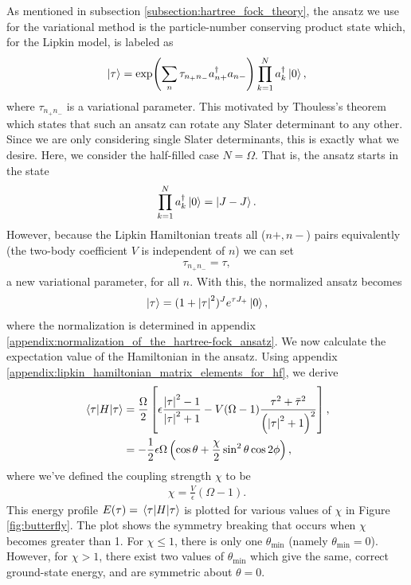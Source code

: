 \documentclass[10pt]{article}
\begin{document}
As mentioned in subsection \ref{subsection:hartree_fock_theory}, the ansatz we use for the variational method is the particle-number conserving product state which, for the Lipkin model, is labeled as
\begin{align}
\ket{\tau}=\exp(\sum_{n}\tau_{n_+n_-}a^\dagger_{n+}a_{n-})\prod_{k=1}^Na^\dagger_k\ket{0},
\end{align}
where $\tau_{n_+n_-}$ is a variational parameter. This motivated by Thouless's theorem which states that such an ansatz can rotate any Slater determinant to any other. Since we are only considering single Slater determinants, this is exactly what we desire. Here, we consider the half-filled case $N=\Omega$. That is, the ansatz starts in the state
\begin{align}
\prod_{k=1}^Na^\dagger_k\ket{0}=\ket{J-J}
.\end{align}
However, because the Lipkin Hamiltonian treats all ($n+,n-$) pairs equivalently (the two-body coefficient $V$ is independent of $n$) we can set 
\begin{align}
\tau_{n_+n_-}=\tau,
\end{align}
a new variational parameter, for all $n$. With this, the normalized ansatz becomes
\begin{align}
\label{su2coh}
\ket{\tau}=(1+\abs{\tau}^2)^Je^{\tau J_+}\ket{0}
,\end{align}
where the normalization is determined in appendix \ref{appendix:normalization_of_the_hartree-fock_ansatz}. We now calculate the expectation value of the Hamiltonian in the ansatz. Using appendix \ref{appendix:lipkin_hamiltonian_matrix_elements_for_hf}, we derive
\begin{align}
\label{te}
\mel{\tau}{H}{\tau}
&=
\frac{\Omega}{2}\left[\epsilon\frac{\abs{\tau}^2-1}{\abs{\tau}^2+1}-V(\Omega-1)\frac{\tau^2+\bar{\tau}^2}{\left(\abs{\tau}^2+1\right)^2}\right],
\nonumber
\\
&=
-\frac{1}{2}\epsilon\Omega\left(\cos\theta+\frac{\chi}{2}\sin^2\theta\cos2\phi\right),
\end{align}
where we've defined the coupling strength $\chi$ to be
\begin{align}
\chi
=
\frac{V}{\epsilon}(\Omega-1).
\end{align}
This energy profile $E(\tau)=\mel{\tau}{H}{\tau}$ is plotted for various values of $\chi$ in Figure \ref{fig:butterfly}. The plot shows the symmetry breaking that occurs when $\chi$ becomes greater than 1. For $\chi\leq1$, there is only one $\theta_{\text{min}}$ (namely $\theta_{\text{min}}=0$). However, for $\chi>1$, there exist two values of $\theta_{\text{min}}$ which give the same, correct ground-state energy, and are symmetric about $\theta=0$.
\end{document}
